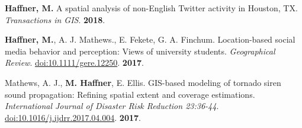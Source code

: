 




\begin{cventries}
   \cventry
      {}
      {}
      {}
      {}
      {
        \begin{cvitems}
          \vspace{-4mm}
        \item {\textbf{Haffner, M.} A spatial analysis of non-English Twitter
            activity in Houston, TX. \textit{Transactions in GIS}.}
            \textbf{2018}. \\
          \vspace{-2mm}
        \end{cvitems}
    }

   \cventry
      {}
      {}
      {}
      {}
      {
        \begin{cvitems}
          \vspace{-4mm} \item {\textbf{Haffner, M.}, A. J. Mathews., E. Fekete,
            G. A. Finchum. Location-based social media behavior and perception:
            Views of university students. \textit{Geographical Review}.
            \href{http://onlinelibrary.wiley.com/doi/10.1111/gere.12250/abstract}{doi:10.1111/gere.12250}.}
          \textbf{2017}.
          \\
          \vspace{-2mm}
        \end{cvitems}
    } %

   \cventry
      {}
      {}
      {}
      {}
      {
        \begin{cvitems}
          \vspace{-4mm}
        \item {Mathews, A. J., \textbf{M. Haffner}, E. Ellis. GIS-based modeling
            of tornado siren sound propagation: Refining spatial extent and
            coverage estimations. \textit{International Journal of Disaster Risk
              Reduction 23:36-44}.
            \href{https://doi.org/10.1016/j.ijdrr.2017.04.004}{doi:10.1016/j.ijdrr.2017.04.004}.}
          \textbf{2017}.\\
          \vspace{-2mm}
        \end{cvitems}
    }

\end{cventries}

